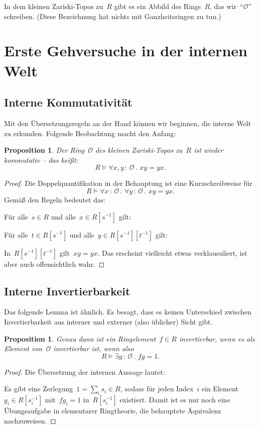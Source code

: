 \documentclass[a4paper,ngerman,12pt]{scrartcl}
\theoremstyle{definition}
\theoremstyle{plain}
\newtheorem{prop}[defn]{Proposition}
\theoremstyle{remark}
\renewcommand{\O}{\mathcal{O}}
\renewcommand{\_}{\mathpunct{.}\,}
\newcommand{\?}{\,{:}\,}
\newenvironment{indentblock}{%
  \list{}{\leftmargin\leftmargin}%
  \item\relax
}{%
  \endlist
}
\begin{document}
In dem kleinen Zariski-Topos zu~$R$ gibt es ein Abbild des Rings~$R$, das
wir~"`$\O$"' schreiben. (Diese Bezeichnung hat nichts mit Ganzheitsringen zu tun.)


\section{Erste Gehversuche in der internen Welt}

\subsection{Interne Kommutativität}

Mit den Übersetzungsregeln an der Hand können wir beginnen, die interne Welt zu
erkunden. Folgende Beobachtung macht den Anfang:

\begin{prop}Der Ring~$\O$ des kleinen Zariski-Topos zu~$R$ ist wieder
kommutativ -- das heißt:
\[ R \models \forall x,y \? \O\_ x y = y x. \]
\end{prop}
\begin{proof}Die Doppelquantifikation in der Behauptung ist eine
Kurzschreibweise für
\[ R \models \forall x\?\O\_ \forall y\?\O\_ x y = y x. \]
Gemäß den Regeln bedeutet das:
\begin{indentblock}
Für alle~$s \in R$ und alle~$x \in R[s^{-1}]$ gilt:
\begin{indentblock}
Für alle~$t \in R[s^{-1}]$ und alle~$y \in R[s^{-1}][t^{-1}]$ gilt:
\begin{indentblock}
In~$R[s^{-1}][t^{-1}]$ gilt~$xy = yx$.
\end{indentblock}
\end{indentblock}
\end{indentblock}
Das erscheint vielleicht etwas verklausuliert, ist aber auch offensichtlich
wahr.
\end{proof}


\subsection{Interne Invertierbarkeit}

Das folgende Lemma ist ähnlich. Es besagt, dass es keinen Unterschied zwischen
Invertierbarkeit aus interner und externer (also üblicher) Sicht gibt.
\begin{prop}\label{interne-invertierbarkeit}%
Genau dann ist ein Ringelement~$f \in R$ invertierbar, wenn es als Element
von~$\O$ invertierbar ist, wenn also
\[ R \models \exists g\?\O\_ fg = 1. \]
\end{prop}
\begin{proof}
Die Übersetzung der internen Aussage lautet:
\begin{indentblock}
Es gibt eine Zerlegung~$1 = \sum_i s_i \in R$, sodass für jeden Index~$i$ ein
Element $g_i \in R[s_i^{-1}]$ mit~$fg_i = 1$ in~$R[s_i^{-1}]$ existiert.
\end{indentblock}
Damit ist es nur noch eine Übungsaufgabe in elementarer Ringtheorie, die
behauptete Äquivalenz nachzuweisen.
\end{proof}
\end{document}
